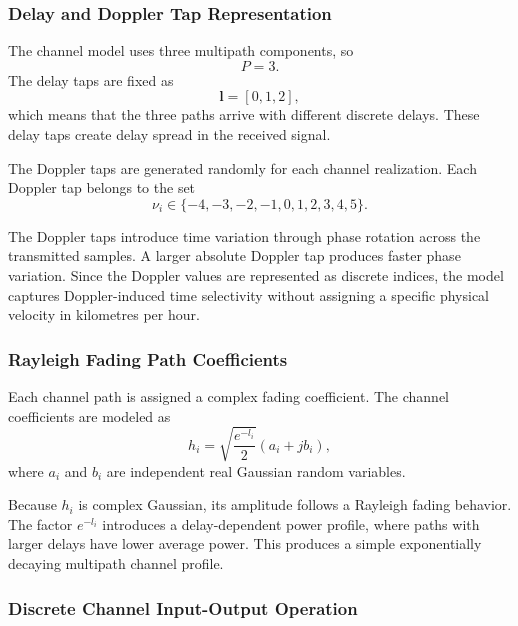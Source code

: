 \subsubsection{Delay and Doppler Tap Representation}

The channel model uses three multipath components, so
\begin{equation}
    P = 3.
\end{equation}
The delay taps are fixed as
\begin{equation}
    \mathbf{l} = [0,1,2],
\end{equation}
which means that the three paths arrive with different discrete delays. These delay taps create delay spread in the received signal.

The Doppler taps are generated randomly for each channel realization. Each Doppler tap belongs to the set
\begin{equation}
    \nu_i \in \{-4,-3,-2,-1,0,1,2,3,4,5\}.
\end{equation}

The Doppler taps introduce time variation through phase rotation across the transmitted samples. A larger absolute Doppler tap produces faster phase variation. Since the Doppler values are represented as discrete indices, the model captures Doppler-induced time selectivity without assigning a specific physical velocity in kilometres per hour.

\subsubsection{Rayleigh Fading Path Coefficients}

Each channel path is assigned a complex fading coefficient. The channel coefficients are modeled as
\begin{equation}
    h_i
    =
    \sqrt{\frac{e^{-l_i}}{2}}
    \left(
    a_i + jb_i
    \right),
    \label{eq:channel_coeff}
\end{equation}
where \(a_i\) and \(b_i\) are independent real Gaussian random variables.

Because \(h_i\) is complex Gaussian, its amplitude follows a Rayleigh fading behavior. The factor \(e^{-l_i}\) introduces a delay-dependent power profile, where paths with larger delays have lower average power. This produces a simple exponentially decaying multipath channel profile.

\subsubsection{Discrete Channel Input-Output Operation}

